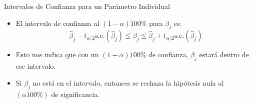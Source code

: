 \documentclass{beamer}
\begin{document}
    






    
    

\begin{frame}{Intervalos de Confianza para un Parámetro Individual}
    \begin{itemize}
        \item El intervalo de confianza al $(1-\alpha)100\%$ para $\beta_j$ es:
        \[
        \hat{\beta}_j - t_{\alpha/2} \text{s.e.}(\hat{\beta}_j) \leq \beta_j \leq \hat{\beta}_j + t_{\alpha/2} \text{s.e.}(\hat{\beta}_j)
        \]
        \item Esto nos indica que con un $(1 - \alpha)100\%$ de confianza, $\beta_j$ estará dentro de ese intervalo.
        \item Si $\beta_j$ no está en el intervalo, entonces se rechaza la hipótesis nula al $(\alpha 100\%)$ de significancia.
    \end{itemize}
\end{frame}
\end{document}
